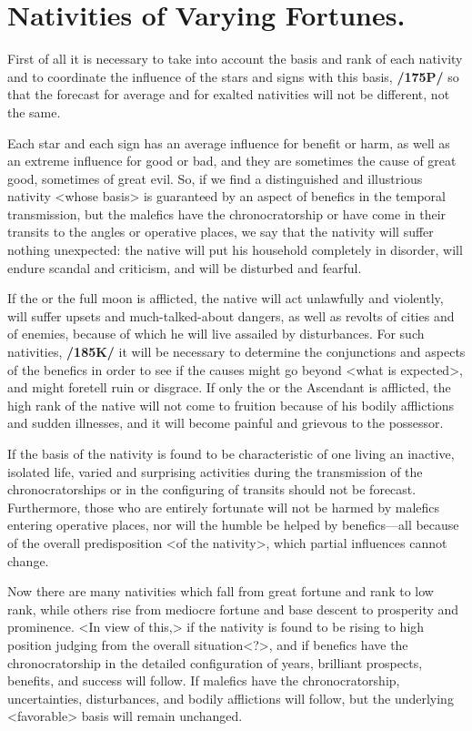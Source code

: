 \section{Nativities of Varying Fortunes.}

First of all it is necessary to take into account the basis and rank of each nativity and to coordinate the influence of the stars and signs with this basis, \textbf{/175P/} so that the forecast for average and for exalted nativities will not be different, not the same. 

Each star and each sign has an average influence for benefit or harm, as well as an extreme influence for good or bad, and they are sometimes the cause of great good, sometimes of great evil. So, if we find a distinguished and illustrious nativity <whose basis> is guaranteed by an aspect of benefics in the temporal transmission, but the malefics have the chronocratorship or have come in their transits to the angles or operative places, we say that the nativity will suffer nothing unexpected: the native will put his household completely in disorder, will endure scandal and criticism, and will be disturbed and fearful. 

If the \Sun\xspace or the full moon is afflicted, the native will act unlawfully and violently, will suffer upsets and much-talked-about dangers, as well as revolts of cities and of enemies, because of which he will live assailed by disturbances. For such nativities, \textbf{/185K/} it will be necessary to determine the conjunctions and aspects of the benefics in order to see if the causes might go beyond <what is expected>, and might foretell ruin or disgrace. If only the \Moon\xspace or the Ascendant is afflicted, the high rank of the native will not come to fruition because of his bodily afflictions and sudden illnesses, and it will become painful and grievous to the possessor.

If the \mndl basis of the nativity is found to be characteristic of one living an inactive, isolated life, varied and surprising activities during the transmission of the chronocratorships or in the configuring of transits should not be forecast. Furthermore, those who are entirely fortunate will not be harmed by malefics entering operative places, nor will the humble be helped by benefics—all because of the overall predisposition <of the nativity>, which partial influences cannot change. 

Now there are many nativities which fall from great fortune and rank to low rank, while others rise from mediocre fortune and base descent to prosperity and prominence. <In view of this,> if the nativity is found to be rising to high position judging from the overall situation<?>, and if benefics have the chronocratorship in the detailed configuration of years, brilliant prospects, benefits, and success will follow. If malefics have the chronocratorship, uncertainties, disturbances, and bodily afflictions will follow, but the underlying <favorable> basis will remain unchanged. 

